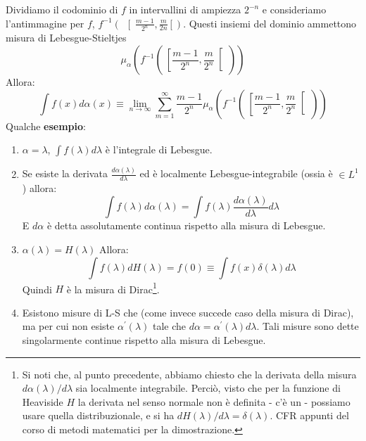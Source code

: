 \documentclass[FisicaTeorica.tex]{subfiles}
\begin{document}
Dividiamo il codominio di $f$ in intervallini di ampiezza $2^{-n}$ e consideriamo l'antimmagine per $f$, $f^{-1}\left(\ \right[\frac{m-1}{2^n},\frac{m}{2n}\left[\right)$. Questi insiemi del dominio ammettono misura di Lebesgue-Stieltjes 
\[ \mu_\alpha\left(f^{-1}\left(\ \left[\frac{m-1}{2^n},\frac{m}{2^n}\right[\,\right)\right) \]
Allora:
\[ 
\int f\left(x\right)d\alpha \left(x\right)\equiv \lim_{n\rightarrow\infty}\sum_{m=1}^{\infty}{\frac{m-1}{2^n} \mu_\alpha\left (f^{-1}\left(\ \left [\frac{m-1}{2^n},\frac{m}{2^n}\right [\>\right)\right )}\]
Qualche \textbf{esempio}:
\begin{enumerate}
    \item $\alpha = \lambda$, $\int f\left(\lambda\right)d\lambda$ è l'integrale di Lebesgue.
	\item Se esiste la derivata $\frac{d\alpha\left(\lambda\right)}{d\lambda}$ ed è localmente Lebesgue-integrabile (ossia è $\in L^1$) allora:
	\begin{equation} \int f\left(\lambda\right)d\alpha\left(\lambda\right)=\int f\left(\lambda\right)\frac{d\alpha\left(\lambda\right)}{d\lambda} d\lambda 
	\label{eqn:cambio-di-misura}
	\end{equation}
	E $d\alpha$ è detta assolutamente continua rispetto alla misura di Lebesgue.
	\item $\alpha \left(\lambda\right)=H\left(\lambda\right)$ Allora:
	\[ \int f\left(\lambda\right)dH\left(\lambda\right)=f\left(0\right)\equiv \int f\left(x\right)\delta \left(\lambda\right)d\lambda \]
	Quindi $H$ è la misura di Dirac\footnote{Si noti che, al punto precedente, abbiamo chiesto che la derivata della misura $d\alpha(\lambda)/d\lambda$ sia localmente integrabile. Perciò, visto che per la funzione di Heaviside $H$ la derivata nel senso normale non è definita - c'è un  - possiamo usare quella distribuzionale, e si ha $dH(\lambda)/d\lambda=\delta(\lambda)$. CFR appunti del corso di metodi matematici per la dimostrazione.}.
	\item Esistono misure di L-S che  (come invece succede caso della misura di Dirac), ma per cui non esiste $\alpha^\prime\left(\lambda\right)$ tale che $d\alpha=\alpha^\prime\left(\lambda\right)d\lambda$. Tali misure sono dette singolarmente continue rispetto alla misura di Lebesgue.
\end{enumerate}
\end{document}
